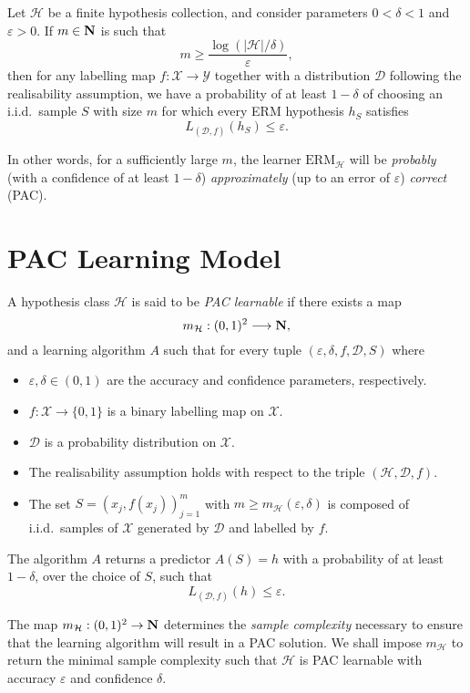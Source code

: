 \begin{corollary}
\label{cor:finite-hypothesis-pac-learnability}
Let \(\mathcal{H}\) be a finite hypothesis collection, and consider parameters
\(0 < \delta < 1\) and \(\varepsilon > 0\). If \(m \in \mathbf{N}\) is such that
\[
m \geq \frac{\log(|\mathcal{H}| / \delta)}{\varepsilon},
\]
then for any labelling map \(f: \mathcal{X} \to \mathcal{Y}\) together with a
distribution \(\mathcal{D}\) following the realisability assumption, we have a
probability of at least \(1 - \delta\) of choosing an i.i.d.~sample \(S\) with
size \(m\) for which every ERM hypothesis \(h_S\) satisfies
\[
L_{(\mathcal{D}, f)}(h_S) \leq \varepsilon.
\]

In other words, for a sufficiently large \(m\), the learner
\(\text{ERM}_{\mathcal{H}}\) will be \emph{probably} (with a confidence of at
least \(1 - \delta\)) \emph{approximately} (up to an error of \(\varepsilon\))
\emph{correct} (PAC).
\end{corollary}

\section{PAC Learning Model}

\begin{definition}
\label{def:pac-learning}
A hypothesis class \(\mathcal{H}\) is said to be \emph{PAC learnable} if there
exists a map
\[
m_{\mathcal{H}}: (0, 1)^2 \longrightarrow \mathbf{N},
\]
and a learning algorithm \(A\) such that for every tuple
\((\varepsilon, \delta, f, \mathcal{D}, S)\) where
\begin{itemize}\setlength\itemsep{0em}
\item \(\varepsilon, \delta \in (0, 1)\) are the accuracy and confidence
  parameters, respectively.
\item \(f: \mathcal{X} \to \{0, 1\}\) is a binary labelling map on \(\mathcal{X}\).
\item \(\mathcal{D}\) is a probability distribution on \(\mathcal{X}\).
\item The realisability assumption holds with respect to the triple
  \((\mathcal{H}, \mathcal{D}, f)\).
\item The set \(S = (x_j, f(x_j))_{j=1}^m\) with \(m \geq
  m_{\mathcal{H}}(\varepsilon, \delta)\) is composed of i.i.d.~samples of
  \(\mathcal{X}\) generated by \(\mathcal{D}\) and labelled by \(f\).
\end{itemize}
The algorithm \(A\) returns a predictor \(A(S) = h\) with a probability of at
least \(1 - \delta\), over the choice of \(S\), such that
\[
L_{(\mathcal{D}, f)}(h) \leq \varepsilon.
\]

The map \(m_{\mathcal{H}}: (0, 1)^2 \to \mathbf{N}\) determines the \emph{sample
  complexity} necessary to ensure that the learning algorithm will result in a
PAC solution. We shall impose \(m_{\mathcal{H}}\) to return the minimal sample
complexity such that \(\mathcal{H}\) is PAC learnable with accuracy
\(\varepsilon\) and confidence \(\delta\).
\end{definition}


